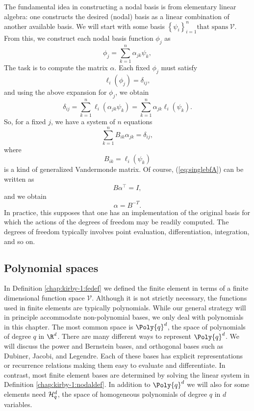The fundamental idea in constructing a nodal basis is from elementary
linear algebra: one constructs the desired (nodal) basis as a linear
combination of another available basis.  We will start with some basis
$\left\{ \psi_i \right\}_{i=1}^{n} \mbox{that spans} \ \mathcal{V}$.
From this, we construct each nodal basis function $\phi_j$ as
%
\begin{equation}
 \phi_j = \sum_{k=1}^n \alpha_{jk} \psi_k,
\end{equation}
The task is to compute the matrix $\alpha$.  Each fixed $\phi_j$ must
satisfy
\begin{equation}
\ell_i( \phi_j ) = \delta_{ij},
\end{equation}
and using the above expansion for $\phi_j$, we obtain
\begin{equation}
\delta_{ij} = \sum_{k=1}^n \ell_i( \alpha_{jk} \psi_{k} ) = \sum_{k=1}^n \alpha_{jk} \ell_i (\psi_k).
\end{equation}
So, for a fixed $j$, we have a system of $n$ equations
\begin{equation}
\label{eq:singlebfA}
\sum_{k=1}^n B_{ik} \alpha_{jk} = \delta_{ij},
\end{equation}
where
\begin{equation}
B_{ik} = \ell_i(\psi_k)
\end{equation}
is a kind of generalized Vandermonde matrix. Of course,
(\ref{eq:singlebfA}) can be written as
\begin{equation}
B \alpha^{\top} = I,
\end{equation}
and we obtain
\begin{equation}
\alpha = B^{-T}.
\end{equation}
In practice, this supposes that one has an implementation of the original
basis for which the actions of the degrees of freedom may be readily
computed.  The degrees of freedom typically involves point evaluation,
differentiation, integration, and so on.

\subsection{Polynomial spaces}

In Definition \ref{chap:kirby-1:fedef} we defined the finite element in
terms of a finite dimensional function space $\mathcal{V}$. Although it
is not strictly necessary, the functions used in finite elements are
typically polynomials.  While our general strategy will in principle
accommodate non-polynomial bases, we only deal with polynomials
in this chapter.  The most common space is $\Poly{q}^d$, the space of
polynomials of degree $q$ in $\R^d$. There are many different ways
to represent $\Poly{q}^d$. We will discuss the power and Bernstein bases,
and orthogonal bases such as Dubiner, Jacobi, and Legendre.  Each of
these bases has explicit representations or recurrence relations making
them easy to evaluate and differentiate. In contrast, most finite
element bases are determined by solving the linear system in Definition
\ref{chap:kirby-1:nodaldef}.  In addition to $\Poly{q}^d$ we will also for
some elements need ${\mathcal{H}}^d_q$, the space of homogeneous polynomials of
degree $q$ in $d$ variables.

